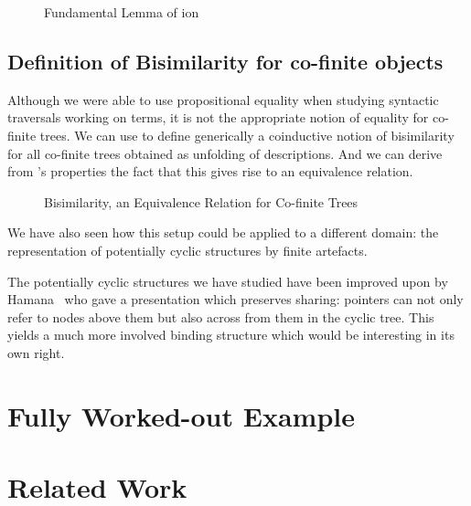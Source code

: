 \begin{figure}[h]
\caption{Fundamental Lemma of ion}
\end{figure}



\subsection{Definition of Bisimilarity for co-finite objects}

Although we were able to use propositional equality when studying
syntactic traversals working on terms, it is not the appropriate
notion of equality for co-finite trees. We can use  to
define generically a coinductive notion of bisimilarity for all
co-finite trees obtained as unfolding of descriptions. And we
can derive from 's properties the fact that this gives
rise to an equivalence relation.

\begin{figure}[h]
\caption{Bisimilarity, an Equivalence Relation for Co-finite Trees}
\end{figure}



We have also seen how this setup
could be applied to a different domain: the representation of potentially
cyclic structures by finite artefacts.


The potentially cyclic structures we have studied have been improved
upon by Hamana~\citeyear{Hamana2009} who gave a presentation which
preserves sharing: pointers can not only refer to nodes above them
but also across from them in the cyclic tree. This yields a much more
involved binding structure which would be interesting in its own right.


\section{Fully Worked-out Example}




\section{Related Work}

